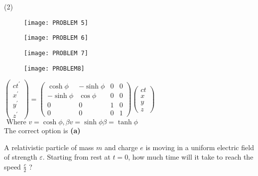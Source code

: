 \begin{enumerate}
\begin{minipage}{\textwidth}
\end{minipage}
\begin{tasks}(2)
	\task[\textbf{A.}]\begin{figure}[H]
		\centering
		\texttt{[image: PROBLEM 5]}
	\end{figure}
	\task[\textbf{B.}]\begin{figure}[H]
		\centering
		\texttt{[image: PROBLEM 6]}
	\end{figure}
	\task[\textbf{C.}]\begin{figure}[H]
		\centering
		\texttt{[image: PROBLEM 7]}
	\end{figure}
	\task[\textbf{D.}]\begin{figure}[H]
		\centering
		\texttt{[image: PROBLEM8]}
	\end{figure}
\end{tasks}
\begin{answer}
$	\left(\begin{array}{c}
		c t^{\prime} \\
		x^{\prime} \\
		y^{\prime} \\
		z^{\prime}
	\end{array}\right)=\left(\begin{array}{cccc}
		\cosh \phi & -\sinh \phi & 0 & 0 \\
		-\sinh \phi & \cos \phi & 0 & 0 \\
		0 & 0 & 1 & 0 \\
		0 & 0 & 0 & 1
	\end{array}\right)\left(\begin{array}{l}
		c t \\
		x \\
		y \\
		z
	\end{array}\right)$\\
	$\text { Where } v=\cosh \phi, \beta v=\sinh \phi \beta=\tanh \phi$\\
	The correct option is \textbf{(a)}
\end{answer}
\begin{minipage}{\textwidth}
	\item A relativistic particle of mass $m$ and charge $e$ is moving in a uniform electric field of strength $\varepsilon$. Starting from rest at $t=0$, how much time will it take to reach the speed $\frac{c}{2}$ ?
\end{minipage}

\end{enumerate}
